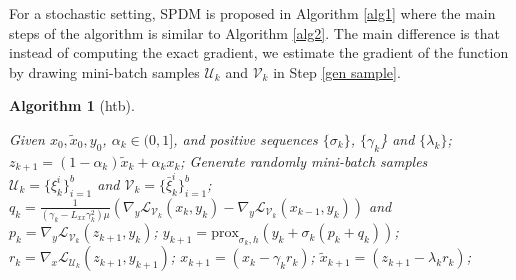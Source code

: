 \documentclass[letterpaper,11 pt]{article}
\newtheorem{algorithm}{Algorithm}
\def\ml{\mathcal L}
\begin{document}
For a stochastic setting, SPDM is proposed in  Algorithm \ref{alg1} where the main steps of the algorithm is similar to  Algorithm \ref{alg2}. The main difference is that  instead of computing the exact gradient, we estimate the gradient of the function by drawing mini-batch samples $\mathcal U_k$ and $\mathcal V_k$ in Step \ref{gen sample}.
\begin{algorithm}[htb]
\caption{Stochastic Primal-Dual with Momentum (SPDM)}
 \label{alg1}
\begin{algorithmic}[1]
   \STATE Given $x_0, \tilde x_0,y_0$, $\alpha_k\in(0,1]$, and positive sequences $\{\sigma_k\}$, $\{\gamma_k$\} and $\{\lambda_k\}$;
   \STATE\label{update z} $z_{k+1} =(1-\alpha_k)\tilde x_{k} +\alpha_kx_{k}$;
   \STATE\label{gen sample} Generate randomly mini-batch samples \\$ \mathcal U_k=\{\xi^i_k\}_{i=1}^b$ and $\mathcal V_k=\{\bar \xi^i_k\}_{i=1}^b$; %
   \STATE \label{update p,q} $q_k=\tfrac{1}{(\gamma_k-L_{xx}\gamma_k^2) \mu}(\nabla_y\ml_{\mathcal V_k}{(x_{k},y_{k})}-\nabla_y\ml_{\mathcal V_k}{(x_{k-1},y_{k})})$ and $p_k=\nabla_y \ml_{\mathcal V_k}{(z_{k+1},y_{k})}$;
   \STATE\label{update y} $y_{k+1}= \mbox{prox}_{\sigma_{k},h}\left(y_{k}+\sigma_k (p_k+ q_k)\right)$;
   \STATE\label{update r} $r_k=\nabla_x \ml_{\mathcal U_k}(z_{k+1},y_{k+1})$;
   \STATE\label{update x} $x_{k+1}= \left(x_k -\gamma_k r_k\right)$;
   \STATE\label{update tilde x} $\tilde x_{k+1}=(z_{k+1}-\lambda_k r_k)$;
   \ENDFOR
\end{algorithmic}
\end{algorithm}
\end{document}
